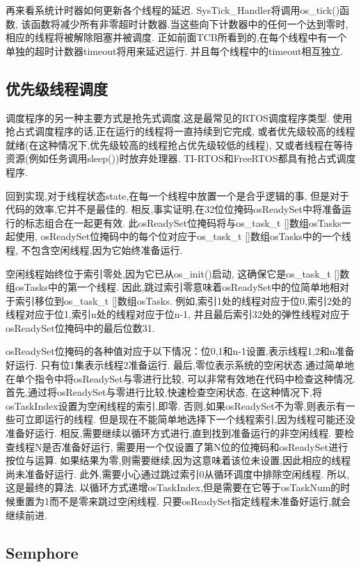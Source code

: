再来看系统计时器如何更新各个线程的延迟.
SysTick\_Handler将调用os\_tick()函数,
该函数将减少所有非零超时计数器.当这些向下计数器中的任何一个达到零时,
相应的线程将被解除阻塞并被调度.
正如前面TCB所看到的,在每个线程中有一个单独的超时计数器timeout将用来延迟运行.
并且每个线程中的timeout相互独立.

\subsection{优先级线程调度}

调度程序的另一种主要方式是抢先式调度,这是最常见的RTOS调度程序类型.
使用抢占式调度程序的话,正在运行的线程将一直持续到它完成,
或者优先级较高的线程就绪(在这种情况下,优先级较高的线程抢占优先级较低的线程),
又或者线程在等待资源(例如任务调用sleep())时放弃处理器.
TI-RTOS和FreeRTOS都具有抢占式调度程序.

回到实现,对于线程状态state,在每一个线程中放置一个是合乎逻辑的事,
但是对于代码的效率,它并不是最佳的.
相反,事实证明,在32位位掩码osReadySet中将准备运行的标志组合在一起更有效.
此osReadySet位掩码将与os\_task\_t []数组osTasks一起使用,
osReadySet位掩码中的每个位对应于os\_task\_t []数组osTasks中的一个线程,
不包含空闲线程,因为它始终准备运行.

空闲线程始终位于索引零处,因为它已从os\_init()启动,
这确保它是os\_task\_t []数组osTasks中的第一个线程.
因此,跳过索引零意味着osReadySet中的位简单地相对于索引移位到os\_task\_t []数组osTasks.
例如,索引1处的线程对应于位0,索引2处的线程对应于位1,索引n处的线程对应于位n-1,
并且最后索引32处的弹性线程对应于osReadySet位掩码中的最后位数31.

osReadySet位掩码的各种值对应于以下情况：位0,1和n-1设置,表示线程1,2和n准备好运行.
只有位1集表示线程2准备运行.
最后,零位表示系统的空闲状态.通过简单地在单个指令中将osReadySet与零进行比较,
可以非常有效地在代码中检查这种情况. 
首先,通过将osReadySet与零进行比较,快速检查空闲状态,
在这种情况下,将osTaskIndex设置为空闲线程的索引,即零.
否则,如果osReadySet不为零,则表示有一些可立即运行的线程.
但是现在不能简单地选择下一个线程索引,因为线程可能还没准备好运行.
相反,需要继续以循环方式进行,直到找到准备运行的非空闲线程.
要检查线程N是否准备好运行,
需要用一个仅设置了第N位的位掩码和osReadySet进行按位与运算.
如果结果为零,则需要继续,因为这意味着该位未设置,因此相应的线程尚未准备好运行.
此外,需要小心通过跳过索引0从循环调度中排除空闲线程.
所以,这是最终的算法.
以循环方式递增osTaskIndex,但是需要在它等于osTaskNum的时候重置为1而不是零来跳过空闲线程.
只要osReadySet指定线程未准备好运行,就会继续前进.
 
\subsection{Semphore}
